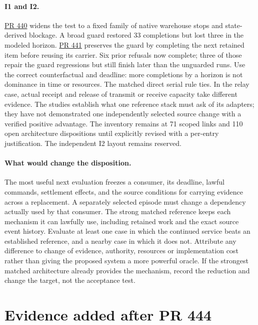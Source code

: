 \documentclass[11pt]{article}
\newcommand{\pr}[1]{\href{https://github.com/eternal-november/eos-research-programmes/pull/#1}{PR #1}}
\begin{document}
\paragraph{I1 and I2.}
\pr{440} widens the test to a fixed family of native warehouse stops and state-derived blockage. A broad guard restored 33 completions but lost three in the modeled horizon. \pr{441} preserves the guard by completing the next retained item before reusing its carrier. Six prior refusals now complete; three of those repair the guard regressions but still finish later than the unguarded runs. Use the correct counterfactual and deadline: more completions by a horizon is not dominance in time or resources. The matched direct serial rule ties. In the relay case, actual receipt and release of transmit or receive capacity take different evidence. The studies establish what one reference stack must ask of its adapters; they have not demonstrated one independently selected source change with a verified positive advantage. The inventory remains at 71 scoped links and 110 open architecture dispositions until explicitly revised with a per-entry justification. The independent I2 layout remains reserved.

\paragraph{What would change the disposition.}
The most useful next evaluation freezes a consumer, its deadline, lawful commands, settlement effects, and the source conditions for carrying evidence across a replacement. A separately selected episode must change a dependency actually used by that consumer. The strong matched reference keeps each mechanism it can lawfully use, including retained work and the exact source event history. Evaluate at least one case in which the continued service beats an established reference, and a nearby case in which it does not. Attribute any difference to change of evidence, authority, resources or implementation cost rather than giving the proposed system a more powerful oracle. If the strongest matched architecture already provides the mechanism, record the reduction and change the target, not the acceptance test.

\section*{Evidence added after PR 444}
\end{document}
